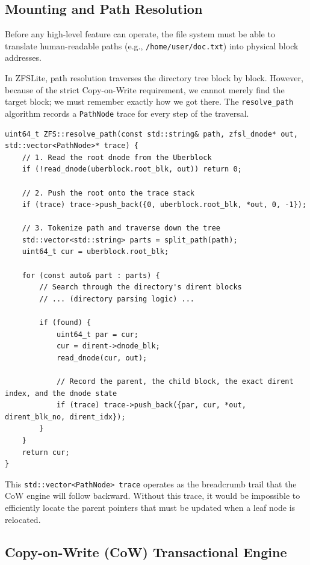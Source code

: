 \documentclass[pdflatex,sn-mathphys-num]{sn-jnl}
\begin{document}
\subsection{Mounting and Path Resolution}

Before any high-level feature can operate, the file system must be able to translate human-readable paths (e.g., \verb+/home/user/doc.txt+) into physical block addresses.

In ZFSLite, path resolution traverses the directory tree block by block. However, because of the strict Copy-on-Write requirement, we cannot merely find the target block; we must remember exactly how we got there. The \verb+resolve_path+ algorithm records a \verb+PathNode+ trace for every step of the traversal.

\begin{lstlisting}[caption={Path resolution and trace recording mechanism.}, label={lst:resolve}]
uint64_t ZFS::resolve_path(const std::string& path, zfsl_dnode* out, std::vector<PathNode>* trace) {
    // 1. Read the root dnode from the Uberblock
    if (!read_dnode(uberblock.root_blk, out)) return 0;
    
    // 2. Push the root onto the trace stack
    if (trace) trace->push_back({0, uberblock.root_blk, *out, 0, -1});
    
    // 3. Tokenize path and traverse down the tree
    std::vector<std::string> parts = split_path(path);
    uint64_t cur = uberblock.root_blk;
    
    for (const auto& part : parts) {
        // Search through the directory's dirent blocks
        // ... (directory parsing logic) ...
        
        if (found) {
            uint64_t par = cur;
            cur = dirent->dnode_blk;
            read_dnode(cur, out);
            
            // Record the parent, the child block, the exact dirent index, and the dnode state
            if (trace) trace->push_back({par, cur, *out, dirent_blk_no, dirent_idx});
        }
    }
    return cur;
}
\end{lstlisting}

This \verb+std::vector<PathNode> trace+ operates as the breadcrumb trail that the CoW engine will follow backward. Without this trace, it would be impossible to efficiently locate the parent pointers that must be updated when a leaf node is relocated.

\subsection{Copy-on-Write (CoW) Transactional Engine}
\end{document}
